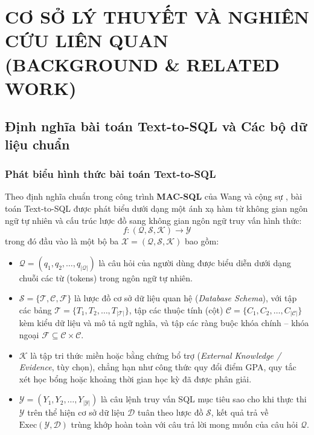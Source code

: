 \documentclass[12pt,a4paper]{report}
\begin{document}
\chapter{CƠ SỞ LÝ THUYẾT VÀ NGHIÊN CỨU LIÊN QUAN (BACKGROUND \& RELATED WORK)}

\section{Định nghĩa bài toán Text-to-SQL và Các bộ dữ liệu chuẩn}

\subsection{Phát biểu hình thức bài toán Text-to-SQL}

Theo định nghĩa chuẩn trong công trình \textbf{MAC-SQL} của Wang và cộng sự \cite{wang2025macsql}, bài toán Text-to-SQL được phát biểu dưới dạng một ánh xạ hàm từ không gian ngôn ngữ tự nhiên và cấu trúc lược đồ sang không gian ngôn ngữ truy vấn hình thức:
\begin{equation}
    f: (\mathcal{Q}, \mathcal{S}, \mathcal{K}) \rightarrow \mathcal{Y}
    \label{eq:text2sql_mapping}
\end{equation}
trong đó đầu vào là một bộ ba $\mathcal{X} = (\mathcal{Q}, \mathcal{S}, \mathcal{K})$ bao gồm:
\begin{itemize}
    \item $\mathcal{Q} = (q_1, q_2, \dots, q_{|\mathcal{Q}|})$ là câu hỏi của người dùng được biểu diễn dưới dạng chuỗi các từ (tokens) trong ngôn ngữ tự nhiên.
    \item $\mathcal{S} = \{\mathcal{T}, \mathcal{C}, \mathcal{F}\}$ là lược đồ cơ sở dữ liệu quan hệ (\textit{Database Schema}), với tập các bảng $\mathcal{T} = \{T_1, T_2, \dots, T_{|\mathcal{T}|}\}$, tập các thuộc tính (cột) $\mathcal{C} = \{C_1, C_2, \dots, C_{|\mathcal{C}|}\}$ kèm kiểu dữ liệu và mô tả ngữ nghĩa, và tập các ràng buộc khóa chính -- khóa ngoại $\mathcal{F} \subseteq \mathcal{C} \times \mathcal{C}$.
    \item $\mathcal{K}$ là tập tri thức miền hoặc bằng chứng bổ trợ (\textit{External Knowledge / Evidence}, tùy chọn), chẳng hạn như công thức quy đổi điểm GPA, quy tắc xét học bổng hoặc khoảng thời gian học kỳ đã được phân giải.
    \item $\mathcal{Y} = (Y_1, Y_2, \dots, Y_{|\mathcal{Y}|})$ là câu lệnh truy vấn SQL mục tiêu sao cho khi thực thi $\mathcal{Y}$ trên thể hiện cơ sở dữ liệu $\mathcal{D}$ tuân theo lược đồ $\mathcal{S}$, kết quả trả về $\text{Exec}(\mathcal{Y}, \mathcal{D})$ trùng khớp hoàn toàn với câu trả lời mong muốn của câu hỏi $\mathcal{Q}$.
\end{itemize}
\end{document}
